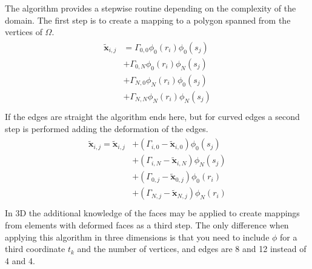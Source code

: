 The algorithm provides a stepwise routine depending on the complexity of the domain. The first step is to create 
a mapping to a polygon spanned from the vertices of $\Omega$.
%
\begin{align}
    \begin{split}
    \mathbf{\tilde{x}}_{i,j} 
             &=\Gamma_{0,0}\phi_0(r_i)\phi_0(s_j)\\
             &+\Gamma_{0,N}\phi_0(r_i)\phi_N(s_j)\\
             &+\Gamma_{N,0}\phi_N(r_i)\phi_0(s_j)\\
             &+\Gamma_{N,N}\phi_N(r_i)\phi_N(s_j)\\
    \end{split}
    \label{eq:gh1}
\end{align}
%
If the edges are straight the algorithm ends here, but for curved edges a second step is performed adding 
the deformation of the edges.
%
\begin{align}
    \begin{split}
        \mathbf{\tilde{x}}_{i,j}  = \mathbf{\tilde{x}}_{i,j} 
             &+(\Gamma_{i,0}-\mathbf{\tilde{x}}_{i,0})\phi_0(s_j)\\
             &+(\Gamma_{i,N}-\mathbf{\tilde{x}}_{i,N})\phi_N(s_j)\\
             &+(\Gamma_{0,j}-\mathbf{\tilde{x}}_{0,j})\phi_0(r_i)\\
             &+(\Gamma_{N,j}-\mathbf{\tilde{x}}_{N,j})\phi_N(r_i)\\
    \end{split}
    \label{eq:gh1}
\end{align}
%
In 3D the additional knowledge of the faces may be applied to create mappings from elements with deformed faces as a 
third step. The only difference when applying this algorithm in three dimensions is that you need to include $\phi$
for a third coordinate $t_k$ and the number of vertices, and edges are 8 and 12 instead of 
4 and 4.



